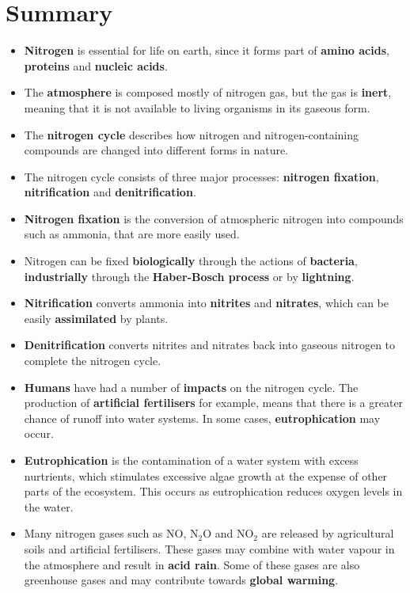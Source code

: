 \section{Summary}

\begin{itemize}
\item{\textbf{Nitrogen} is essential for life on earth, since it forms part of \textbf{amino acids}, \textbf{proteins} and \textbf{nucleic acids}.}
\item{The \textbf{atmosphere} is composed mostly of nitrogen gas, but the gas is \textbf{inert}, meaning that it is not available to living organisms in its gaseous form.}
\item{The \textbf{nitrogen cycle} describes how nitrogen and nitrogen-containing compounds are changed into different forms in nature.}
\item{The nitrogen cycle consists of three major processes: \textbf{nitrogen fixation}, \textbf{nitrification} and \textbf{denitrification}.}
\item{\textbf{Nitrogen fixation} is the conversion of atmospheric nitrogen into compounds such as ammonia, that are more easily used.}
\item{Nitrogen can be fixed \textbf{biologically} through the actions of \textbf{bacteria}, \textbf{industrially} through the \textbf{Haber-Bosch process} or by \textbf{lightning}.}
\item{\textbf{Nitrification} converts ammonia into \textbf{nitrites} and \textbf{nitrates}, which can be easily \textbf{assimilated} by plants.}
\item{\textbf{Denitrification} converts nitrites and nitrates back into gaseous nitrogen to complete the nitrogen cycle.}
\item{\textbf{Humans} have had a number of \textbf{impacts} on the nitrogen cycle. The production of \textbf{artificial fertilisers} for example, means that there is a greater chance of runoff into water systems. In some cases, \textbf{eutrophication} may occur.}
\item{\textbf{Eutrophication} is the contamination of a water system with excess nurtrients, which stimulates excessive algae growth at the expense of other parts of the ecosystem.  This occurs as eutrophication reduces oxygen levels in the water.}
\item{Many nitrogen gases such as NO, N$_{2}$O and NO$_{2}$ are released by agricultural soils and artificial fertilisers. These gases may combine with water vapour in the atmosphere and result in \textbf{acid rain}. Some of these gases are also greenhouse gases and may contribute towards \textbf{global warming}.}

\end{itemize}
